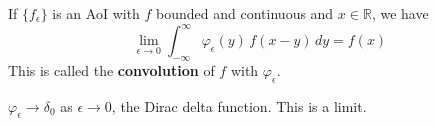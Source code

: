   \begin{corollary}[Convolution]
    \label{thm:convolution}
    If $\{f_\epsilon\}$ is an AoI with $f$ bounded and continuous and $x \in \mathbb{R}$, we have 
    \begin{equation}
      \lim_{\epsilon \to 0} \int_{-\infty}^\infty \varphi_\epsilon (y) \, f(x - y) \,dy  = f(x)
    \end{equation}
    This is called the \textbf{convolution} of $f$ with $\varphi_\epsilon$. 
  \end{corollary}

  \begin{definition}
    \label{def:dirac-delta-function}
    $\varphi_\epsilon \to \delta_0$ as $\epsilon \to 0$, the Dirac delta function. This is a limit. 
  \end{definition}

